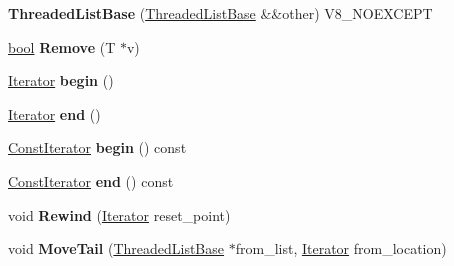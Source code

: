 \begin{DoxyCompactItemize}
\item 
\mbox{\label{classv8_1_1base_1_1ThreadedListBase_ab70e292e19cda027db8862340869577b}} 
{\bfseries Threaded\+List\+Base} (\mbox{\hyperlink{classv8_1_1base_1_1ThreadedListBase}{Threaded\+List\+Base}} \&\&other) V8\+\_\+\+N\+O\+E\+X\+C\+E\+PT
\item 
\mbox{\label{classv8_1_1base_1_1ThreadedListBase_aec2ba86579b29011cb287224f44b329a}} 
\mbox{\hyperlink{classbool}{bool}} {\bfseries Remove} (T $\ast$v)
\item 
\mbox{\label{classv8_1_1base_1_1ThreadedListBase_a0be7b03a84f29a824fd8549804fa868d}} 
\mbox{\hyperlink{classv8_1_1base_1_1ThreadedListBase_1_1Iterator}{Iterator}} {\bfseries begin} ()
\item 
\mbox{\label{classv8_1_1base_1_1ThreadedListBase_a332c735789bb9f92cafb4f5f2b7e0197}} 
\mbox{\hyperlink{classv8_1_1base_1_1ThreadedListBase_1_1Iterator}{Iterator}} {\bfseries end} ()
\item 
\mbox{\label{classv8_1_1base_1_1ThreadedListBase_ae5aa40732eb63279b2ec88887aa71ee4}} 
\mbox{\hyperlink{classv8_1_1base_1_1ThreadedListBase_1_1ConstIterator}{Const\+Iterator}} {\bfseries begin} () const
\item 
\mbox{\label{classv8_1_1base_1_1ThreadedListBase_ad7575a451502bf9abc0b1a4b8da1968e}} 
\mbox{\hyperlink{classv8_1_1base_1_1ThreadedListBase_1_1ConstIterator}{Const\+Iterator}} {\bfseries end} () const
\item 
\mbox{\label{classv8_1_1base_1_1ThreadedListBase_acdd543ded4ba70778fc14fe49ac62ee9}} 
void {\bfseries Rewind} (\mbox{\hyperlink{classv8_1_1base_1_1ThreadedListBase_1_1Iterator}{Iterator}} reset\+\_\+point)
\item 
\mbox{\label{classv8_1_1base_1_1ThreadedListBase_aabe1f1e7b911da4907abf8c65dac67eb}} 
void {\bfseries Move\+Tail} (\mbox{\hyperlink{classv8_1_1base_1_1ThreadedListBase}{Threaded\+List\+Base}} $\ast$from\+\_\+list, \mbox{\hyperlink{classv8_1_1base_1_1ThreadedListBase_1_1Iterator}{Iterator}} from\+\_\+location)

\end{DoxyCompactItemize}
